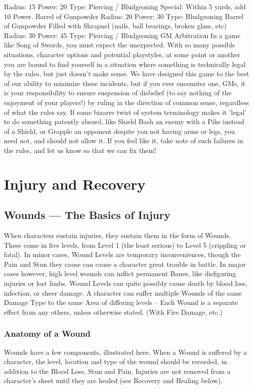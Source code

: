 \documentclass[oneside,11pt,english]{book}
\begin{document}
Radius: 15
Power: 20
Type: Piercing / Bludgeoning
Special: Within 5 yards, add 10 Power.
Barrel of Gunpowder
Radius: 20
Power: 30
Type: Bludgeoning
Barrel of Gunpowder Filled with Shrapnel (nails, ball bearings, broken glass, etc)
Radius: 30
Power: 45
Type: Piercing / Bludgeoning
GM Arbitration
In a game like Song of Swords, you must expect the unexpected. With so many possible situations,
character options and potential playstyles, at some point or another you are bound to find yourself in a
situation where something is technically legal by the rules, but just doesn’t make sense.
We have designed this game to the best of our ability to minimize these incidents, but if you ever
encounter one, GMs, it is your responsibility to ensure suspension of disbelief (to say nothing of the
enjoyment of your players!) by ruling in the direction of common sense, regardless of what the rules say.
If some bizarre twist of system terminology makes it ‘legal’ to do something patently absurd, like Shield
Bash an enemy with a Pike instead of a Shield, or Grapple an opponent despite you not having arms or
legs, you need not, and should not allow it.
If you feel like it, take note of such failures in the rules, and let us know so that we can fix them!
\chapter{Injury and Recovery}\label{ch:injuryrecovery}
\startcontents[chapters]
\clearpage
\section{Wounds --- The Basics of Injury}
When characters sustain injuries, they sustain them in the form of Wounds. These come in five levels, from Level 1 (the least serious) to Level 5 (crippling or fatal). In minor cases, Wound Levels are temporary inconveniences, though the Pain and Stun they cause can cause a character great trouble in battle. In major cases however, high level wounds can inflict permanent Banes, like disfiguring injuries or lost limbs. Wound Levels can quite possibly cause death by blood loss, infection, or sheer damage. A character can suffer multiple Wounds of the same Damage Type to the same Area of differing levels -- Each Wound is a separate effect from any others, unless otherwise stated. (With Fire Damage, etc.)

\subsection{Anatomy of a Wound}
Wounds have a few components, illustrated here. When a Wound is suffered by a character, the level, location and type of the wound should be recorded, in addition to the Blood Loss, Stun and Pain. 
Injuries are not removed from a character’s sheet until they are healed (see Recovery and Healing below).
\end{document}
